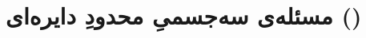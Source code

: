 %
%
%
%
%
%
%
%






















\section{مسئله‌ی سه‌جسمیِ محدودِ دایره‌ای ()}\label{sec:crtbp}

